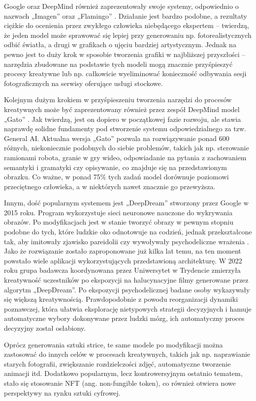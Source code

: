 \documentclass[12pt]{article}
\begin{document}
Google oraz DeepMind również zaprezentowały swoje systemy, odpowiednio o nazwach „Imagen” oraz „Flamingo”  \cite{7,8}. Działanie jest bardzo podobne, a rezultaty ciężkie do ocenienia przez zwykłego człowieka niebędącego ekspertem – twierdzą, że jeden model może sprawować się lepiej przy generowaniu np. fotorealistycznych odbić światła, a drugi w grafikach o ujęciu bardziej artystycznym. Jednak na pewno jest to duży krok w sposobie tworzenia grafiki w najbliższej przyszłości – narzędzia zbudowane na podstawie tych modeli mogą znacznie przyśpieszyć procesy kreatywne lub np. całkowicie wyeliminować konieczność odbywania sesji fotograficznych na serwisy oferujące usługi stockowe.

Kolejnym dużym krokiem w przyśpieszeniu tworzenia narzędzi do procesów kreatywnych może być zaprezentowany również przez zespół DeepMind model „Gato” \cite{9}. Jak twierdzą, jest on dopiero w początkowej fazie rozwoju, ale stawia naprawdę solidne fundamenty pod stworzenie systemu odpowiedzialnego za tzw. General AI. Aktualna wersja „Gato” pozwala na rozwiązywanie ponad 600 różnych, niekoniecznie podobnych do siebie problemów, takich jak np. sterowanie ramionami robota, granie w gry wideo, odpowiadanie na pytania z zachowaniem semantyki i gramatyki czy opisywanie, co znajduje się na przedstawionym obrazku. Co ważne, w ponad 75\% tych zadań model dorównuje poziomowi przeciętnego człowieka, a w niektórych nawet znacznie go przewyższa.

Innym, dość popularnym systemem jest „DeepDream” stworzony przez Google w 2015 roku. Program wykorzystuje sieci neuronowe nauczone do wykrywania obrazów. Po modyfikacjach jest w stanie tworzyć obrazy w pewnym stopniu podobne do tych, które ludzkie oko odnotowuje na codzień, jednak przekształcone tak, aby imitowały zjawisko pareidolii czy wywoływały psychodeliczne wrażenia \cite{10}. Jako że rozwiązanie zostało zaproponowane już kilka lat temu, na ten moment powstało wiele aplikacji wykorzystujących przedstawioną architekturę. W 2022 roku grupa badawcza koordynowana przez Uniwersytet w Trydencie zmierzyła kreatywność uczestników po ekspozycji na halucynacyjne filmy generowane przez algorytm „DeepDream”. Po ekspozycji psychodelicznej badane osoby wykazywały się większą kreatywnością. Prawdopodobnie z powodu reorganizacji dynamiki poznawczej, która ułatwia eksplorację nietypowych strategii decyzyjnych i hamuje automatyczne wybory dokonywane przez ludzki mózg, ich automatyczny proces decyzyjny został osłabiony.

Oprócz generowania sztuki strice, te same modele po modyfikacji można zastosować do innych celów w procesach kreatywnych, takich jak np. naprawianie starych fotografii, zwiększanie rozdzielczości zdjęć, automatyczne tworzenie animacji itd. Dodatkowo popularnym, lecz kontrowersyjnym ostatnio tematem, stało się stosowanie NFT (ang. non-fungible token), co również otwiera nowe perspektywy na rynku sztuki cyfrowej.
\end{document}
